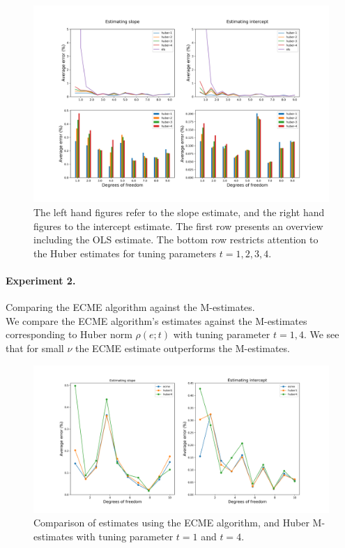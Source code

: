 \documentclass[11pt, a4 paper]{article}
\begin{document}
\begin{figure}[H]
\begin{center}
\includegraphics[scale=0.45]{experiment-m.png}
\end{center}
\caption{The left hand figures refer to the slope estimate, and the right hand figures to the intercept estimate. The first row presents an overview including the OLS estimate. The bottom row restricts attention to the Huber estimates for tuning parameters $t=1, 2, 3, 4$.}
\end{figure}

\newpage
\paragraph{Experiment 2.} Comparing the ECME algorithm against the M-estimates.\\

We compare the ECME algorithm's estimates against the M-estimates corresponding to Huber norm $\rho(e; t)$ with tuning parameter $t=1,4$. We see that for small $\nu$ the ECME estimate outperforms the M-estimates.

\begin{figure}[H]
\begin{center}
\includegraphics[scale=0.45]{experiment-ecme.png}
\end{center}
\caption{Comparison of estimates using the ECME algorithm, and Huber M-estimates with tuning parameter $t=1$ and $t=4$.}
\end{figure}
\end{document}
